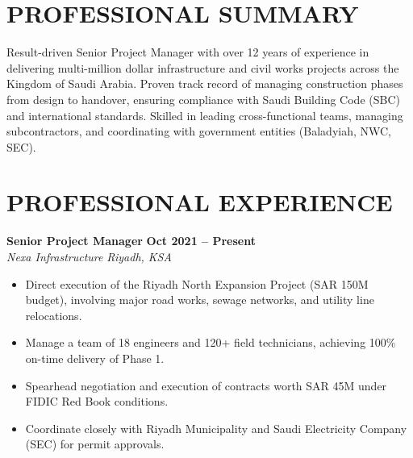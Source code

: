 \documentclass[10pt,a4paper]{article}
\begin{document}
\begin{minipage}[t]{0.63\textwidth}
    \section*{PROFESSIONAL SUMMARY}
    Result-driven Senior Project Manager with over 12 years of experience in delivering multi-million dollar infrastructure and civil works projects across the Kingdom of Saudi Arabia. Proven track record of managing construction phases from design to handover, ensuring compliance with Saudi Building Code (SBC) and international standards. Skilled in leading cross-functional teams, managing subcontractors, and coordinating with government entities (Baladyiah, NWC, SEC).
    
    \vspace{0.4cm}
    
    \section*{PROFESSIONAL EXPERIENCE}
    
    \noindent
    {\large\bfseries\color{primary} Senior Project Manager} \hfill {\small\bfseries\color{secondary} Oct 2021 -- Present} \\
    {\itshape\color{darktext}Nexa Infrastructure} \hfill {\small\itshape\color{secondary} Riyadh, KSA}
    \begin{itemize}[leftmargin=12pt, topsep=3pt]
        \item Direct execution of the Riyadh North Expansion Project (SAR 150M budget), involving major road works, sewage networks, and utility line relocations.
        \item Manage a team of 18 engineers and 120+ field technicians, achieving 100\% on-time delivery of Phase 1.
        \item Spearhead negotiation and execution of contracts worth SAR 45M under FIDIC Red Book conditions.
        \item Coordinate closely with Riyadh Municipality and Saudi Electricity Company (SEC) for permit approvals.
    \end{itemize}
    
    \vspace{0.4cm}
    

\end{minipage}
\end{document}
